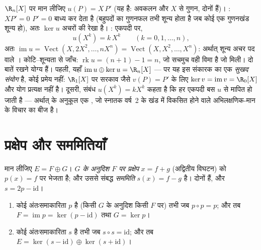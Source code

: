 \begin{example}[ऑयलर संकारक की अष्टि और प्रतिबिंब]
\label{ex:b1:linmaps:euler}
$\R_n[X]$ पर मान लीजिए $u(P) = X\,P'$ (यह  है: अवकलन और $X$ से गुणन,
दोनों  हैं)। \emph{}: $XP' = 0$ $P' = 0$ बाध्य कर देता है (बहुपदों
का गुणनफल तभी शून्य होता है जब कोई एक गुणनखंड शून्य हो), अतः $\ker u$ अचरों
की रेखा है। \emph{}: एकपदी  पर,
\[
u(X^k) = k\,X^{k} \qquad (k = 0, 1, \dots, n),
\]
अतः $\operatorname{im} u = \operatorname{Vect}(X, 2X^2, \dots, nX^n) =
\operatorname{Vect}(X, X^2, \dots, X^n)$: अर्थात् शून्य अचर पद वाले ।
कोटि--शून्यता से जाँच: $\operatorname{rk} u = (n + 1) - 1 = n$, जो सचमुच वही
विमा है जो मिली। दो बातें रखने योग्य हैं। पहली, यहाँ $\operatorname{im} u
\oplus \ker u = \R_n[X]$ --- पर यह इस संकारक का एक \emph{सुखद संयोग} है, कोई
प्रमेय नहीं: $\R_1[X]$ पर सरकाव जैसे $v(P) = P'$ के लिए $\ker v =
\operatorname{im} v = \R_0[X]$ और योग प्रत्यक्ष नहीं है। दूसरी, संबंध
$u(X^k) = kX^k$ कहता है कि हर एकपदी बस $u$ से मापित हो जाती है --- अर्थात्
 के अनुकूल एक , जो स्नातक वर्ष~2 के खंड में विकसित होने वाले
अभिलक्षणिक-मान के विचार का बीज है।
\end{example}

\section{प्रक्षेप और सममितियाँ}

\begin{definition}\label{def:b1:linmaps:projection}
मान लीजिए $E = F \oplus G$। \emph{$G$ के अनुदिश $F$ पर
प्रक्षेप} $x = f + g$ (अद्वितीय विघटन) को $p(x) = f$ पर
भेजता है; और उससे संबद्ध \emph{सममिति} $s(x) = f - g$ है।
दोनों  हैं, और $s = 2p - \mathrm{id}$।
\end{definition}

\begin{theorem}[बीजगणितीय अभिलक्षण]\label{thm:b1:linmaps:projchar}
\begin{enumerate}
  \item कोई अंतःसमाकारिता $p$  है (किसी $G$ के अनुदिश किसी $F$ पर)
  तभी जब $p \circ p = p$; और तब $F = \operatorname{im} p = \ker(p -
  \mathrm{id})$ तथा $G = \ker p$।
  \item कोई अंतःसमाकारिता $s$  है तभी जब $s \circ s = \mathrm{id}$; और
  तब $E = \ker(s - \mathrm{id}) \oplus \ker(s + \mathrm{id})$।
\end{enumerate}
\end{theorem}

